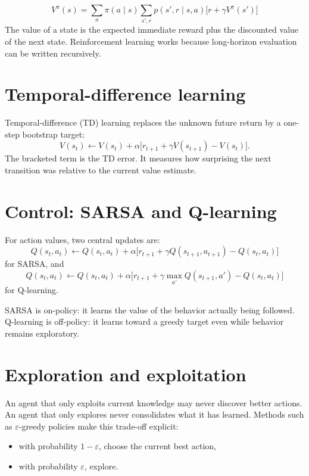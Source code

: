 \begin{keyequation}
\[
V^\pi(s)
=
\sum_a \pi(a \mid s)
\sum_{s',r}
p(s',r \mid s,a)
\bigl[r + \gamma V^\pi(s')\bigr]
\]
\tcblower
The value of a state is the expected immediate reward plus the discounted value of the next state. Reinforcement learning works because long-horizon evaluation can be written recursively.
\end{keyequation}

\section{Temporal-difference learning}

Temporal-difference (TD) learning replaces the unknown future return by a one-step bootstrap target:
\[
  V(s_t)
  \leftarrow
  V(s_t) + \alpha
  \bigl[
    r_{t+1} + \gamma V(s_{t+1}) - V(s_t)
  \bigr].
\]
The bracketed term is the TD error. It measures how surprising the next transition was relative to the current value estimate.

\section{Control: SARSA and Q-learning}

For action values, two central updates are:
\[
  Q(s_t,a_t)
  \leftarrow
  Q(s_t,a_t)
  +
  \alpha
  \bigl[
    r_{t+1}
    +
    \gamma Q(s_{t+1},a_{t+1})
    -
    Q(s_t,a_t)
  \bigr]
\]
for SARSA, and
\[
  Q(s_t,a_t)
  \leftarrow
  Q(s_t,a_t)
  +
  \alpha
  \bigl[
    r_{t+1}
    +
    \gamma \max_{a'} Q(s_{t+1},a')
    -
    Q(s_t,a_t)
  \bigr]
\]
for Q-learning.

SARSA is on-policy: it learns the value of the behavior actually being followed. Q-learning is off-policy: it learns toward a greedy target even while behavior remains exploratory.

\section{Exploration and exploitation}

An agent that only exploits current knowledge may never discover better actions. An agent that only explores never consolidates what it has learned. Methods such as $\varepsilon$-greedy policies make this trade-off explicit:
\begin{itemize}
  \item with probability $1-\varepsilon$, choose the current best action,
  \item with probability $\varepsilon$, explore.
\end{itemize}

